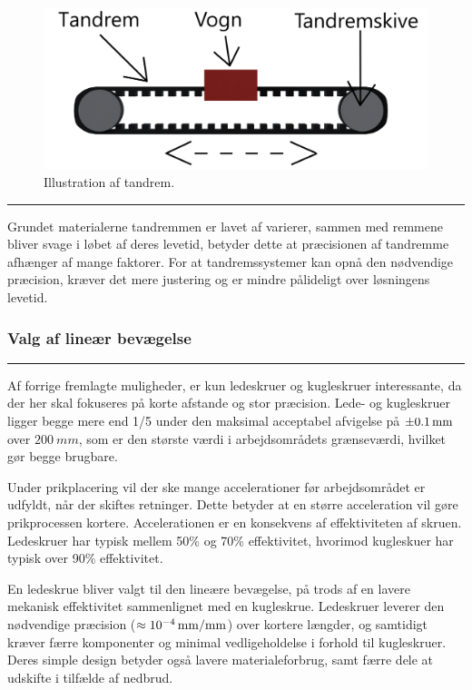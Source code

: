 \begin{figure}[H]
    \centering
\includegraphics[width=0.6\linewidth]{Sections/5 Konceptgenerering/Media/Illustration af tandrem 7.png}
    \caption{Illustration af tandrem.}
    \label{fig: Illustration af tandrem}
\end{figure} \plainbreak{-.5}

Grundet materialerne tandremmen er lavet af varierer, sammen med remmene bliver svage i løbet af deres levetid, betyder dette at præcisionen af tandremme afhænger af mange faktorer. For at tandremssystemer kan opnå den nødvendige præcision, kræver det mere justering og er mindre pålideligt over løsningens levetid. \parencite{Casillo2025Belt-DrivenInc} 


\subsubsection{Valg af lineær bevægelse}  \plainbreak{-0.5}
Af forrige fremlagte muligheder, er kun ledeskruer og kugleskruer interessante, da der her skal fokuseres på korte afstande og stor præcision. Lede- og kugleskruer ligger begge mere end 1/5 under den maksimal acceptabel afvigelse på \(\SI{\pm0,1}{mm}\) over \(\SI{200}{mm}\), som er den største værdi i arbejdsområdets grænseværdi, hvilket gør begge brugbare.

Under prikplacering vil der ske mange accelerationer før arbejdsområdet er udfyldt, når der skiftes retninger. Dette betyder at en større acceleration vil gøre prikprocessen kortere. Accelerationen er en konsekvens af effektiviteten af skruen. Ledeskruer har typisk mellem 50\% og 70\% effektivitet, hvorimod kugleskuer har typisk over 90\% effektivitet. \parencite{johoty.com2025BallBest}

En ledeskrue bliver valgt til den lineære bevægelse, på trods af en lavere mekanisk effektivitet sammenlignet med en kugleskrue. Ledeskruer leverer den nødvendige præcision ($\approx \SI{d-4}{mm/mm}$) over kortere længder, og samtidigt kræver færre komponenter og minimal vedligeholdelse i forhold til kugleskruer. Deres simple design betyder også lavere materialeforbrug, samt færre dele at udskifte i tilfælde af nedbrud. 